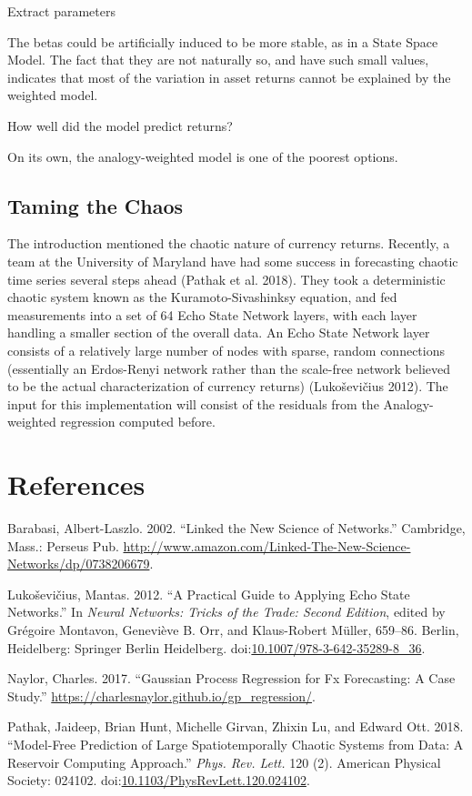 \documentclass[]{article}
\begin{document}
Extract parameters

The betas could be artificially induced to be more stable, as in a State
Space Model. The fact that they are not naturally so, and have such
small values, indicates that most of the variation in asset returns
cannot be explained by the weighted model.

How well did the model predict returns?

On its own, the analogy-weighted model is one of the poorest options.

\subsection{Taming the Chaos}\label{taming-the-chaos}

The introduction mentioned the chaotic nature of currency returns.
Recently, a team at the University of Maryland have had some success in
forecasting chaotic time series several steps ahead (Pathak et al.
2018). They took a deterministic chaotic system known as the
Kuramoto-Sivashinksy equation, and fed measurements into a set of 64
Echo State Network layers, with each layer handling a smaller section of
the overall data. An Echo State Network layer consists of a relatively
large number of nodes with sparse, random connections (essentially an
Erdos-Renyi network rather than the scale-free network believed to be
the actual characterization of currency returns) (Lukoševičius 2012).
The input for this implementation will consist of the residuals from the
Analogy-weighted regression computed before.

\section*{References}\label{references}

\hypertarget{refs}{}
\hypertarget{ref-barabasi2002linked}{}
Barabasi, Albert-Laszlo. 2002. ``Linked the New Science of Networks.''
Cambridge, Mass.: Perseus Pub.
\url{http://www.amazon.com/Linked-The-New-Science-Networks/dp/0738206679}.

\hypertarget{ref-Luko2012}{}
Lukoševičius, Mantas. 2012. ``A Practical Guide to Applying Echo State
Networks.'' In \emph{Neural Networks: Tricks of the Trade: Second
Edition}, edited by Grégoire Montavon, Geneviève B. Orr, and
Klaus-Robert Müller, 659--86. Berlin, Heidelberg: Springer Berlin
Heidelberg.
doi:\href{https://doi.org/10.1007/978-3-642-35289-8_36}{10.1007/978-3-642-35289-8\_36}.

\hypertarget{ref-naylor_GP}{}
Naylor, Charles. 2017. ``Gaussian Process Regression for Fx Forecasting:
A Case Study.'' \url{https://charlesnaylor.github.io/gp_regression/}.

\hypertarget{ref-PhysRevLett.120.024102}{}
Pathak, Jaideep, Brian Hunt, Michelle Girvan, Zhixin Lu, and Edward Ott.
2018. ``Model-Free Prediction of Large Spatiotemporally Chaotic Systems
from Data: A Reservoir Computing Approach.'' \emph{Phys. Rev. Lett.} 120
(2). American Physical Society: 024102.
doi:\href{https://doi.org/10.1103/PhysRevLett.120.024102}{10.1103/PhysRevLett.120.024102}.
\end{document}
